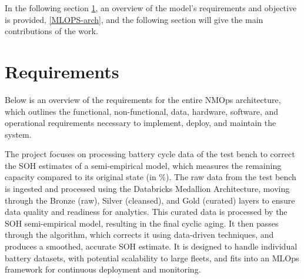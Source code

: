 In the following section \ref{sec:req}, an overview of the model's requirements and objective is provided, \ref{MLOPS-arch}, and the following section will give the main contributions of the work.

\section{Requirements}
\label{sec:req}
Below is an overview of the requirements for the entire NMOps architecture, which outlines the functional, non-functional, data, hardware, software, and operational requirements necessary to implement, deploy, and maintain the system.

The project focuses on processing battery cycle data of the test bench to correct the SOH estimates of a semi-empirical model, which measures the remaining capacity compared to its original state (in \%). The raw data from the test bench is ingested and processed using the Databricks Medallion Architecture, moving through the Bronze (raw), Silver (cleansed), and Gold (curated) layers to ensure data quality and readiness for analytics. This curated data is processed by the SOH semi-empirical model, resulting in the final cyclic aging. It then passes through the algorithm, which corrects it using data-driven techniques, and produces a smoothed, accurate SOH estimate. It is designed to handle individual battery datasets, with potential scalability to large fleets, and fits into an MLOps framework for continuous deployment and monitoring. 


